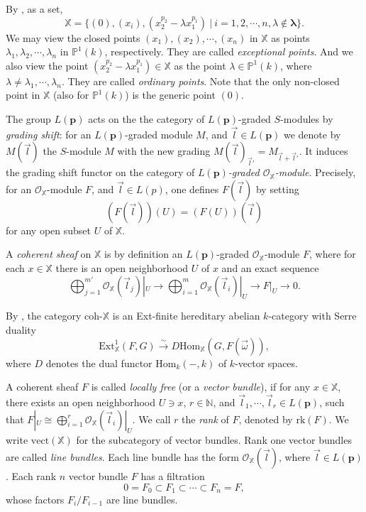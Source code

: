 \documentclass[a4paper, 11pt, reqno]{amsart}
\numberwithin{equation}{section}
\theoremstyle{remark}
\theoremstyle{definition}
\begin{document}
By \cite[Proposition~1.3]{geigle1987class}, as a set,
\[
   \mathbb X=\{(0),(x_i),(x_2^{p_2}- \lambda x_1^{p_1}) \ | \ i=1,2, \cdots, n, \lambda \notin \bm \lambda \}.
\]
We may view the closed points $(x_1),(x_2), \cdots, (x_n)$ in $\mathbb X$ as points $ \lambda_1, \lambda_2, \cdots, \lambda_n $ in $\mathbb P^1(k)$, respectively. They are called \emph{exceptional points}. And we also view the point $(x_2^{p_2}- \lambda x_1^{p_1}) \in \mathbb X$ as the point $\lambda \in \mathbb P^1(k)$, where $\lambda \neq \lambda_1, \cdots, \lambda_n$. They are called \emph{ordinary points}. Note that the only non-closed point in $\mathbb X$ (also for $\mathbb P^1(k)$) is the generic point $(0)$.

The group $L(\bm{p})$ acts on the the category of $L(\bm p)$-graded $S$-modules by \emph{grading shift}: for an $L(\bm p)$-graded module $M$, and $\vec l \in L(\bm p)$ we denote by $M(\vec l)$ the $S$-module $M$ with the new grading $M(\vec l)_{\vec l'}=M_{\vec l + \vec l'}$. It induces the grading shift functor on the category of \emph{$L(\bm p)$-graded $\mathcal O_{\mathbb X}$-module}. Precisely, for an $\mathcal O_{\mathbb X}$-module $F$, and $\vec l \in L(p)$, one defines $F(\vec l)$ by setting 
\[
   (F(\vec l))(U)=(F(U))(\vec l)
\]
for any open subset $U$ of $\mathbb X$.

A \emph{coherent sheaf} on $\mathbb X$ is by definition an $L(\bm p)$-graded $\mathcal O_{\mathbb X}$-module $F$, where for each $x \in \mathbb X$ there is an open neighborhood $U$ of $x$ and an exact sequence
\[
   \bigoplus_{j=1}^{m'} \mathcal O_{\mathbb X}(\vec l_j)|_U \to \bigoplus_{i=1}^m \mathcal O_{\mathbb X}(\vec l_i)|_U \to F|_U \to 0.
\]


By \cite{geigle1987class}, the category $\mathrm{coh} \text{-} \mathbb X$ is an Ext-finite hereditary abelian $k$-category with Serre duality
\[
\mathrm{Ext}_{\mathbb X}^1(F,G)\xrightarrow{\sim} D \mathrm{Hom}_{\mathbb X}(G,F(\vec \omega)),
\]
where $D$ denotes the dual functor $\mathrm{Hom}_k (-,k)$ of $k$-vector spaces.

A coherent sheaf $F$ is called \emph{locally free} (or a \emph{vector bundle}), if for any $x\in \mathbb X$, there exists an open neighborhood $U\ni x$, $r\in \mathbb N$, and $\vec l_1,\cdots ,\vec l_r \in L(\bm p)$, such that $F|_{U}\cong \bigoplus_{i=1}^r\mathcal O_{\mathbb X}(\vec l_i)|_{U}$. We call $r$ the \emph{rank} of $F$, denoted by $\mathrm{rk}(F)$. We write $\mathrm{vect}(\mathbb X)$ for the subcategory of vector bundles. Rank one vector bundles are called \emph{line bundles}. Each line bundle has the form $\mathcal O_{\mathbb{X}}(\vec l)$, where $\vec l \in L(\bm p)$. Each rank $n$ vector bundle $F$ has a filtration
\[
0=F_0 \subset F_1 \subset \cdots \subset F_n=F,
\]
whose factors $F_i/F_{i-1}$ are line bundles.
\end{document}
